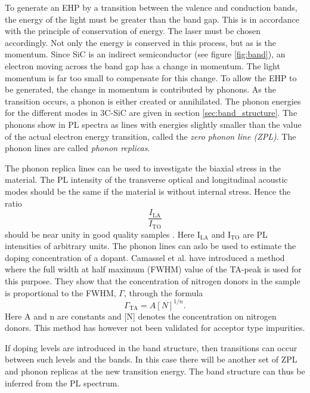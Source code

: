 To generate an EHP by a transition between the valence and conduction bands, the energy of the light must be greater than the band gap. This is in accordance with the principle of conservation of energy. The laser must be chosen accordingly. Not only the energy is conserved in this process, but as is the momentum. Since SiC is an indirect semiconductor (see figure \ref{fig:band}), an electron moving across the band gap has a change in momentum. The light momentum is far too small to compensate for this change. To allow the EHP to be generated, the change in momentum is contributed by phonons. As the transition occurs, a phonon is either created or annihilated. The phonon energies for the different modes in 3C-SiC are given in section \ref{sec:band_structure}. The phonons show in PL spectra as lines with energies slightly smaller than the value of the actual electron energy transition, called the \emph{zero phonon line (ZPL)}. The phonon lines are called \emph{phonon replicas}. 

The phonon replica lines can be used to investigate the biaxial stress in the material. The PL intensity of the transverse optical and longitudinal acoustic modes should be the same if the material is without internal stress. Hence the ratio 
\[\frac{I_{\mathrm{LA}}}{I_{\mathrm{TO}}}\]
should be near unity in good quality samples \cite{Sun2012b}. Here I$_\mathrm{LA}$ and I$_\mathrm{TO}$ are PL intensities of arbitrary units. The phonon lines can aslo be used to estimate the doping concentration of a dopant. Camassel et al. have introduced a method where the full width at half maximum (FWHM) value of the TA-peak is used for this purpose. They show that the concentration of nitrogen donors in the sample is proportional to the FWHM, $\Gamma$, through the formula
\begin{equation}
\label{eq:fwhm}
\Gamma_\mathrm{TA} = A[N]^{1/n}.
\end{equation}
Here A and n are constants and [N] denotes the concentration on nitrogen donors. This method has however not been validated for acceptor type impurities. 


If doping levels are introduced in the band structure, then transitions can occur between such levels and the bands. In this case there will be another set of ZPL and phonon replicas at the new transition energy. The band structure can thus be inferred from the PL spectrum. 

